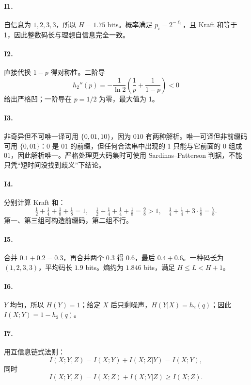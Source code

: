 \paragraph{I1.}
自信息为 $1,2,3,3$，所以 $H=1.75$ bits。概率满足 $p_i=2^{-\ell_i}$，且 Kraft 和等于 1，因此整数码长与理想自信息完全一致。

\paragraph{I2.}
直接代换 $1-p$ 得对称性。二阶导
\[
h_2''(p)=-\frac1{\ln2}\left(\frac1p+\frac1{1-p}\right)<0
\]
给出严格凹；一阶导在 $p=1/2$ 为零，最大值为 1。

\paragraph{I3.}
非奇异但不可唯一译可用 $\{0,01,10\}$，因为 $010$ 有两种解析。唯一可译但非前缀码可用 $\{0,01\}$：$0$ 是 $01$ 的前缀，但任何合法串中出现的 1 只能与它前面的 0 组成 $01$，因此解析唯一。严格处理更大码集时可使用 Sardinas--Patterson 判据，不能只凭“短时间没找到歧义”下结论。

\paragraph{I4.}
分别计算 Kraft 和：
\[
\tfrac12+\tfrac14+\tfrac18+\tfrac18=1,
\quad
\tfrac12+\tfrac14+\tfrac14+\tfrac18=\tfrac98>1,
\quad
\tfrac14+\tfrac14+3\cdot\tfrac18=\tfrac78.
\]
第一、第三组可构造前缀码，第二组不行。

\paragraph{I5.}
合并 $0.1+0.2=0.3$，再合并两个 $0.3$ 得 $0.6$，最后 $0.4+0.6$。一种码长为 $(1,2,3,3)$，平均码长 $1.9$ bits。熵约为 $1.846$ bits，满足 $H\le L<H+1$。

\paragraph{I6.}
$Y$ 均匀，所以 $H(Y)=1$；给定 $X$ 后只剩噪声，$H(Y|X)=h_2(q)$；因此 $I(X;Y)=1-h_2(q)$。

\paragraph{I7.}
用互信息链式法则：
\[
I(X;Y,Z)=I(X;Y)+I(X;Z|Y)=I(X;Y),
\]
同时
\[
I(X;Y,Z)=I(X;Z)+I(X;Y|Z)\ge I(X;Z).
\]

